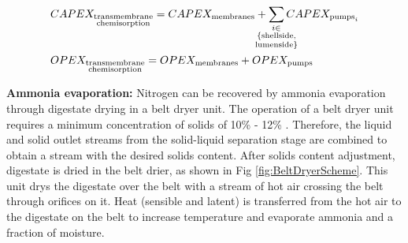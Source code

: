\begin{refsection}[referencesCh6]
\begin{align}	
	& CAPEX_{\substack{\text{transmembrane} \\ \text{chemisorption}}}	= CAPEX_{\text{membranes}} + \sum_{\mathclap{\substack{i 
				\in \\
				\{\text{shellside,} \\ 
				\text{lumenside}\}}}} CAPEX_{\text{pumps}_i} \label{eq:CAPEX_Transmem}
	\\
	& OPEX_{\substack{\text{transmembrane} \\ \text{chemisorption}}}	= OPEX_{\text{membranes}} + OPEX_{\text{pumps}} \label{eq:OPEX_Transmem}
\end{align}	



\textbf{Ammonia evaporation:} Nitrogen can be recovered by ammonia evaporation through digestate drying in a belt dryer unit. The operation of a belt dryer unit requires a minimum concentration of solids of 10\% - 12\% \citep{bolzonella2018nutrients}. Therefore, the liquid and solid outlet streams from the solid-liquid separation stage are combined to obtain a stream with the desired solids content. After solids content adjustment, digestate is dried in the belt drier, as shown in Fig \ref{fig:BeltDryerScheme}. This unit drys the digestate over the belt with a stream of hot air crossing the belt through orifices on it. Heat (sensible and latent) is transferred from the hot air to the digestate on the belt
to increase temperature
and evaporate
ammonia and a fraction of moisture.



\end{refsection}
